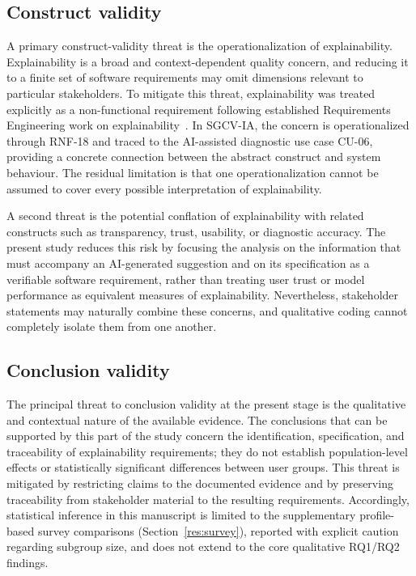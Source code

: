 \documentclass[pdflatex,sn-mathphys-num,Numbered]{sn-jnl}
\begin{document}
\subsection{Construct validity}\label{tv:construct}

A primary construct-validity threat is the operationalization of explainability. Explainability is a broad and context-dependent quality concern, and reducing it to a finite set of software requirements may omit dimensions relevant to particular stakeholders. To mitigate this threat, explainability was treated explicitly as a non-functional requirement following established Requirements Engineering work on explainability~\cite{chazette2020,chazette2021,chazette2022}. In SGCV-IA, the concern is operationalized through RNF-18 and traced to the AI-assisted diagnostic use case CU-06, providing a concrete connection between the abstract construct and system behaviour. The residual limitation is that one operationalization cannot be assumed to cover every possible interpretation of explainability.

A second threat is the potential conflation of explainability with related constructs such as transparency, trust, usability, or diagnostic accuracy. The present study reduces this risk by focusing the analysis on the information that must accompany an AI-generated suggestion and on its specification as a verifiable software requirement, rather than treating user trust or model performance as equivalent measures of explainability. Nevertheless, stakeholder statements may naturally combine these concerns, and qualitative coding cannot completely isolate them from one another.

\subsection{Conclusion validity}\label{tv:conclusion}

The principal threat to conclusion validity at the present stage is the qualitative and contextual nature of the available evidence. The conclusions that can be supported by this part of the study concern the identification, specification, and traceability of explainability requirements; they do not establish population-level effects or statistically significant differences between user groups. This threat is mitigated by restricting claims to the documented evidence and by preserving traceability from stakeholder material to the resulting requirements. Accordingly, statistical inference in this manuscript is limited to the supplementary profile-based survey comparisons (Section~\ref{res:survey}), reported with explicit caution regarding subgroup size, and does not extend to the core qualitative RQ1/RQ2 findings.
\end{document}
